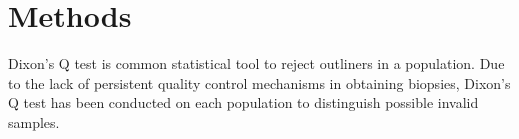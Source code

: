 \chapter{Methods}

Dixon's Q test is common statistical tool to reject outliners in a population. Due to the lack of persistent quality control mechanisms in obtaining biopsies, Dixon's Q test has been conducted on each population to distinguish possible invalid samples. 